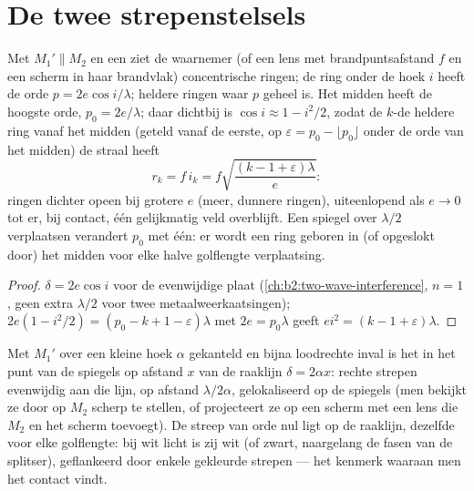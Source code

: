 \section{De twee strepenstelsels}

\begin{proposition}\label{prop:b2:michelson:rings}
Met $M_1' \parallel M_2$ en een  ziet de waarnemer (of een lens
met brandpuntsafstand $f$ en een scherm in haar brandvlak) concentrische
ringen; de ring onder de hoek $i$ heeft de orde $p = 2e\cos i/\lambda$; heldere
ringen waar $p$ geheel is. Het midden heeft de hoogste orde,
$p_0 =
2e/\lambda$; daar dichtbij is $\cos i \approx 1 - i^2/2$, zodat de
$k$-de heldere ring vanaf het
midden (geteld vanaf de eerste, op $\varepsilon = p_0 - \lfloor p_0\rfloor$
onder de orde van het midden) de straal heeft
\[
r_k = f\,i_k = f\sqrt{\frac{(k - 1 + \varepsilon)\lambda}e} :
\]
ringen dichter opeen bij grotere $e$ (meer, dunnere ringen), uiteenlopend
als $e \to 0$
tot er, bij contact, één gelijkmatig veld overblijft. Een spiegel over
$\lambda/2$ verplaatsen verandert
$p_0$ met één: er wordt een ring geboren in (of opgeslokt door) het midden voor elke
halve golflengte verplaatsing.
\end{proposition}

\begin{proof}
$\delta = 2e\cos i$ voor de evenwijdige plaat (\cref{ch:b2:two-wave-interference},
$n = 1$, geen extra $\lambda/2$ voor twee metaalweerkaatsingen);
$2e(1 - i^2/2) =
(p_0 - k + 1 - \varepsilon)\lambda$ met $2e = p_0\lambda$
geeft $ei^2 = (k - 1 + \varepsilon)\lambda$.
\end{proof}

\begin{proposition}\label{prop:b2:michelson:wedge}
Met $M_1'$ over een kleine hoek $\alpha$ gekanteld en bijna loodrechte inval is het
 in het punt van de spiegels op afstand $x$ van de
raaklijn $\delta = 2\alpha x$: rechte strepen evenwijdig aan die lijn,
op afstand $\lambda/2\alpha$, gelokaliseerd op de spiegels (men bekijkt ze door op
$M_2$ scherp te stellen, of projecteert ze op een scherm met een lens die
$M_2$ en het
scherm toevoegt). De streep van orde nul ligt op de raaklijn, dezelfde voor
elke golflengte: bij wit licht is zij wit (of zwart, naargelang de
fasen van de splitser), geflankeerd door enkele gekleurde strepen --- het
kenmerk waaraan men het contact vindt.
\end{proposition}

